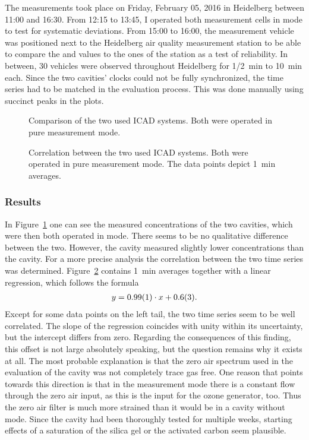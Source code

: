 The measurements took place on Friday, February 05, 2016 in Heidelberg
between 11:00 and 16:30. From 12:15 to 13:45, I operated both
measurement cells in  mode to test for systematic
deviations. From 15:00 to 16:00, the measurement vehicle was
positioned next to the Heidelberg air quality measurement station to
be able to compare the  and  values to the ones of the
station as a test of reliability. In between, 30 vehicles were
observed throughout Heidelberg for {\nfrac{} 1/2}~\si{\minute} to
\SI{10}{\minute} each.  Since the two cavities' clocks could not be
fully synchronized, the time series had to be matched in the
evaluation process. This was done manually using succinct peaks in the
plots.

\begin{figure}[htbp]
  \centering
  
  \caption{Comparison of the two used ICAD systems. Both were
    operated in pure  measurement mode.}
  \label{fig:hd-comparison}
\end{figure}
\begin{figure}[htbp]
  \centering
  
  \caption{Correlation between the two used ICAD systems. Both were
    operated in pure  measurement mode. The data points depict
    \SI{1}{\minute} averages.}
  \label{fig:hd-corr}
\end{figure}

\subsubsection{Results}
\label{sec:vehicle-results}

In Figure~\ref{fig:hd-comparison} one can see the measured
 concentrations of the two cavities, which were then both
operated in  mode. There seems to be no qualitative difference
between the two. However, the  cavity measured slightly lower
concentrations than the  cavity. For a more precise analysis
the correlation between the two time series was
determined. Figure~\ref{fig:hd-corr} contains \SI{1}{\minute} averages
together with a linear regression, which follows the formula
\begin{align*}
  y = \num{0.99 \pm 0.01} \cdot x + \num{0.6 \pm 0.3}.
\end{align*}
Except for some data points on the left tail, the two time series seem
to be well correlated. The slope of the regression coincides with
unity within its uncertainty, but the intercept differs from
zero. Regarding the consequences of this finding, this offset is not
large absolutely speaking, but the question remains why it exists at
all. The most probable explanation is that the zero air spectrum used
in the evaluation of the  cavity was not completely trace gas
free. One reason that points towards this direction is that in the
 measurement mode there is a constant flow through the zero
air input, as this is the input for the ozone generator, too. Thus the
zero air filter is much more strained than it would be in a cavity
without  mode. Since the cavity had been thoroughly tested
for multiple weeks, starting effects of a saturation of the silica gel
or the activated carbon seem plausible.

